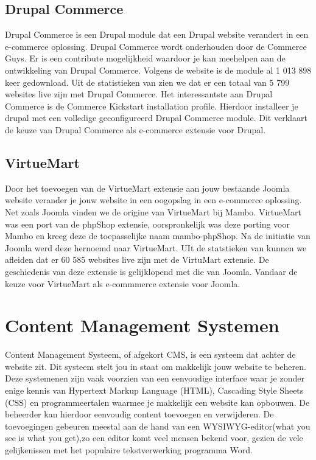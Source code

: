 \subsection{Drupal Commerce}
Drupal Commerce is een Drupal module dat een Drupal website verandert in een e-commerce oplossing. Drupal Commerce wordt onderhouden door de Commerce Guys. Er is een contribute mogelijkheid waardoor je kan meehelpen aan de ontwikkeling van Drupal Commerce. Volgens de \textcite{Drupal2018a} website is de module al 1 013 898 keer gedownload. Uit de statistieken van \textcite{Builtwith2018b} zien we dat er een totaal van 5 799 websites live zijn met Drupal Commerce. Het interessantste aan Drupal Commerce is de Commerce Kickstart installation profile. Hierdoor installeer je drupal met een volledige geconfigureerd Drupal Commerce module. Dit verklaart de keuze van Drupal Commerce als e-commerce extensie voor Drupal.
\subsection{VirtueMart}
Door het toevoegen van de VirtueMart extensie aan jouw bestaande Joomla website verander je jouw website in een oogopslag in een e-commerce oplossing. Net zoals Joomla vinden we de origine van VirtueMart bij Mambo. VirtueMart was een port van de phpShop extensie, oorspronkelijk was deze porting voor Mambo en kreeg deze de toepasselijke naam mambo-phpShop. Na de initiatie van Joomla werd deze hernoemd naar VirtueMart. UIt de statstieken van \textcite{Builtwith2018c} kunnen we afleiden dat er 60 585 websites live zijn met de VirtuMart extensie. De geschiedenis van deze extensie is gelijklopend met die van Joomla. Vandaar de keuze voor VirtueMart als e-commmerce extensie voor Joomla.

\section{Content Management Systemen}
Content Management Systeem, of afgekort CMS, is een systeem dat achter de website zit. Dit systeem stelt jou in staat om makkelijk jouw website te beheren. Deze systemenen zijn vaak voorzien van een eenvoudige interface waar je zonder enige kennis van Hypertext Markup Language (HTML), Cascading Style Sheets (CSS) en programmeertalen waarmee je makkelijk een website kan opbouwen. De beheerder kan hierdoor eenvoudig content toevoegen en verwijderen. De toevoegingen gebeuren meestal aan de hand van een WYSIWYG-editor(what you see is what you get),zo een editor komt veel mensen bekend voor, gezien de vele gelijkenissen met het populaire tekstverwerking programma Word. \autocite{forresult2014,wphandleiding2015}


